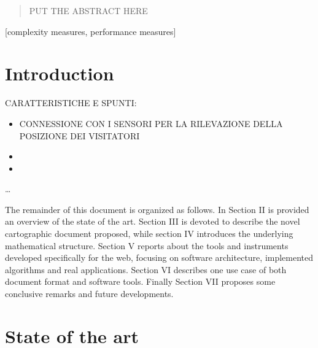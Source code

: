\documentclass{sig-alternate}
\begin{document}
\maketitle
\begin{abstract}
PUT THE ABSTRACT HERE
\end{abstract}

[complexity measures, performance measures]



\section{Introduction}\label{introduction}

CARATTERISTICHE E SPUNTI:

\begin{itemize}
\item
  CONNESSIONE CON I SENSORI PER LA RILEVAZIONE DELLA POSIZIONE DEI
  VISITATORI
\item
\item
\end{itemize}

\ldots{}

The remainder of this document is organized as follows. In Section II is
provided an overview of the state of the art. Section III is devoted to
describe the novel cartographic document proposed, while section IV
introduces the underlying mathematical structure. Section V reports
about the tools and instruments developed specifically for the web,
focusing on software architecture, implemented algorithms and real
applications. Section VI describes one use case of both document format
and software tools. Finally Section VII proposes some conclusive remarks
and future developments.

\section{State of the art}\label{state-of-the-art}
\end{document}

